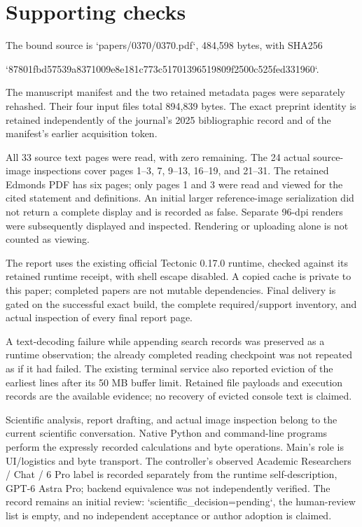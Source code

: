 \documentclass[10pt]{article}
\begin{document}
\section*{Supporting checks}
The bound source is `papers/0370/0370.pdf`, 484,598 bytes, with SHA256\par
`87801fbd57539a8371009e8e181c773c51701396519809f2500c525fed331960`.\par
The manuscript manifest and the two retained metadata pages were separately rehashed. Their four input files total 894,839 bytes. The exact preprint identity is retained independently of the journal’s 2025 bibliographic record and of the manifest’s earlier acquisition token.\par
All 33 source text pages were read, with zero remaining. The 24 actual source-image inspections cover pages 1–3, 7, 9–13, 16–19, and 21–31. The retained Edmonds PDF has six pages; only pages 1 and 3 were read and viewed for the cited statement and definitions. An initial larger reference-image serialization did not return a complete display and is recorded as false. Separate 96-dpi renders were subsequently displayed and inspected. Rendering or uploading alone is not counted as viewing.\par
The report uses the existing official Tectonic 0.17.0 runtime, checked against its retained runtime receipt, with shell escape disabled. A copied cache is private to this paper; completed papers are not mutable dependencies. Final delivery is gated on the successful exact build, the complete required/support inventory, and actual inspection of every final report page.\par
A text-decoding failure while appending search records was preserved as a runtime observation; the already completed reading checkpoint was not repeated as if it had failed. The existing terminal service also reported eviction of the earliest lines after its 50 MB buffer limit. Retained file payloads and execution records are the available evidence; no recovery of evicted console text is claimed.\par
Scientific analysis, report drafting, and actual image inspection belong to the current scientific conversation. Native Python and command-line programs perform the expressly recorded calculations and byte operations. Main’s role is UI/logistics and byte transport. The controller’s observed Academic Researchers / Chat / 6 Pro label is recorded separately from the runtime self-description, GPT-6 Astra Pro; backend equivalence was not independently verified. The record remains an initial review: `scientific\_decision=pending`, the human-review list is empty, and no independent acceptance or author adoption is claimed.\par
\end{document}
